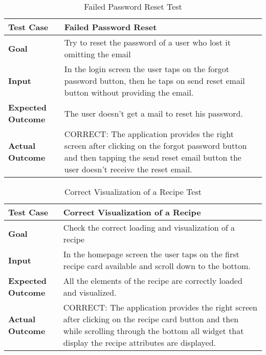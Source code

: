 \begin{table}[H]
	\centering
	\begin{tabular}{|l|l|}
	\hline
	\textbf{Test Case}& Failed Password Reset\\
	\hline
	\textbf{Goal}& Try to reset the password of a user who lost it omitting the email\\
	\hline
	\textbf{Input}& 
	\begin{minipage}{.7\linewidth}
	In the login screen the user taps on the forgot password button, then he taps on send reset email button without providing the email.
	\end{minipage}\\
	\hline
	\textbf{Expected Outcome}& The user doesn't get a mail to reset his password.\\
	\hline
	\textbf{Actual Outcome}& 
	\begin{minipage}{.7\linewidth}
	CORRECT: The application provides the right screen after clicking on the forgot password button and then tapping the send reset email button the user doesn't receive the reset email.
	\end{minipage}\\
	\hline	
	\end{tabular}
	\caption{Failed Password Reset Test}
\end{table}

\begin{table}[H]
	\centering
	\begin{tabular}{|l|l|}
		\hline
		\textbf{Test Case}& Correct Visualization of a Recipe\\
		\hline
		\textbf{Goal}& Check the correct loading and visualization of a recipe\\
		\hline
		\textbf{Input}& 
		\begin{minipage}{.7\linewidth}
			In the homepage screen the user taps on the first recipe card available and scroll down to the bottom.
		\end{minipage}\\
		\hline
		\textbf{Expected Outcome}& All the elements of the recipe are correctly loaded and visualized.\\
		\hline
		\textbf{Actual Outcome}& 
		\begin{minipage}{.7\linewidth}
			CORRECT: The application provides the right screen after clicking on the recipe card button and then while scrolling through the bottom all widget that display the recipe attributes are displayed.
		\end{minipage}\\
		\hline	
	\end{tabular}
	\caption{Correct Visualization of a Recipe Test}
\end{table}

